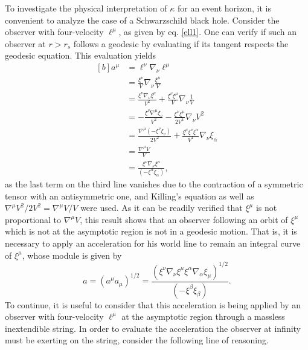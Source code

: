 \documentclass[
12pt,		%
openright,	%
twoside,  %
a4paper,			%
chapter=TITLE,		%
english,			%
french,				%
spanish,			%
brazil				%
]{USPSC-classe/USPSC}
\begin{document}
To investigate the physical interpretation of $\kappa$ for an event horizon, it is convenient to analyze the case of a Schwarzschild black hole. Consider the observer with four-velocity $\ell^{\mu}$, as given by eq. \ref{ell1}. One can verify if such an observer at $r>r_s$ follows a geodesic by evaluating if its tangent respects the geodesic equation. This evaluation yields
\begin{equation}
\begin{aligned}[b]
    a^{\mu}&=\ell^{\nu}\nabla_{\nu}\ell^{\mu}\\
    &=\frac{\xi^{\nu}}{V}\nabla_{\nu}\frac{\xi^{\mu}}{V}\\
    &=\frac{\xi^{\nu}\nabla_{\nu}\xi^{\mu}}{V^2}+\frac{\xi^{\nu}{\xi^{\mu}}}{V}\nabla_{\nu}\frac{1}{V}\\
    &=-\frac{\xi^{\nu}\nabla^{\mu}\xi_{\nu}}{V^2}-\frac{\xi^{\nu}{\xi^{\mu}}}{2V^4}\nabla_{\nu}V^2\\
    &=\frac{\nabla^{\mu}(-\xi^{\nu}\xi_{\nu})}{2V^2}+\frac{{\xi^{\mu}\xi^{\nu}\xi^{\alpha}}}{V^4}\nabla_{\nu}\xi_{\alpha}\\
    &=\frac{\nabla^{\mu}V}{V}\\
    &=\frac{\xi^{\nu}\nabla_{\nu}\xi^{\mu}}{(-\xi^{\alpha}\xi_{\alpha})},
    \end{aligned}
\end{equation}
as the last term on the third line vanishes due to the contraction of a symmetric tensor with an antisymmetric one, and Killing's equation as well as $\nabla^{\mu}V^2/2V^2=\nabla^{\mu}V/V$ were used. As it can be readily verified that $\xi^{\mu}$ is not proportional to $\nabla^{\mu}V$, this result shows that an observer following an orbit of $\xi^{\mu}$ which is not at the asymptotic region is not in a geodesic motion. That is, it is necessary to apply an acceleration for his world line to remain an integral curve of $\xi^{\mu}$, whose module is given by
\begin{equation}\label{local}
    a=(a^{\mu}a_{\mu})^{1/2}=\frac{(\xi^{\nu}\nabla_{\nu}\xi^{\mu}\xi^{\alpha}\nabla_{\alpha}\xi_{\mu})^{1/2}}{(-\xi^{\beta}\xi_{\beta})}.
\end{equation}
To continue, it is useful to consider that this acceleration is being applied by an observer with four-velocity $\ell^{\mu}$ at the asymptotic region through a massless inextendible string. In order to evaluate the acceleration the observer at infinity must be exerting on the string, consider the following line of reasoning.
\end{document}
